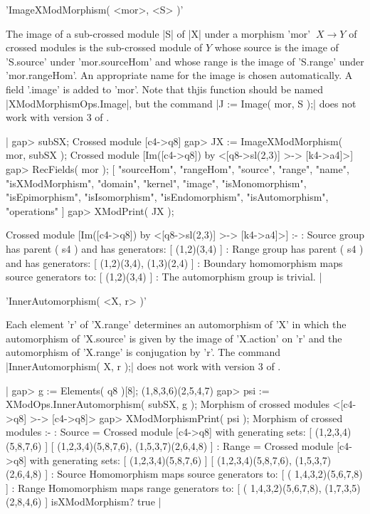 %

'ImageXModMorphism( <mor>, <S> )'

The  image of a sub-crossed module  |S| of |X|  under a morphism 'mor'
$\: X \to Y$ of crossed modules is the sub-crossed module of $Y$ whose
source  is  the image  of  'S.source' under  'mor.sourceHom' and whose
range is the image of  'S.range' under 'mor.rangeHom'.  An appropriate
name for the image is chosen automatically.  A field '.image' is added
to  'mor'.    Note      that    thjis function  should      be   named
|XModMorphismOps.Image|, but the command |J := Image(  mor, S );| does
not work with version 3 of {\GAP}.

|    gap> subSX;
    Crossed module [c4->q8]
    gap> JX := ImageXModMorphism( mor, subSX );
    Crossed module [Im([c4->q8]) by <[q8->sl(2,3)] >-> [k4->a4]>]
    gap> RecFields( mor );
    [ "sourceHom", "rangeHom", "source", "range", "name", "isXModMorphism",
       "domain", "kernel", "image", "isMonomorphism", "isEpimorphism",
       "isIsomorphism", "isEndomorphism", "isAutomorphism", "operations" ]
    gap> XModPrint( JX );
    
    Crossed module [Im([c4->q8]) by <[q8->sl(2,3)] >-> [k4->a4]>] :-
    : Source group has parent ( s4 )  and has generators:
      [ (1,2)(3,4) ]
    : Range group has parent ( s4 )  and has generators:
      [ (1,2)(3,4), (1,3)(2,4) ]
    : Boundary homomorphism maps source generators to:
      [ (1,2)(3,4) ]
    : The automorphism group is trivial.  |
    
%

'InnerAutomorphism( <X, r> )'

Each element 'r' of  'X.range' determines an   automorphism of 'X'  in
which the   automorphism of 'X.source'   is  given  by the  image   of
'X.action' on 'r' and the  automorphism of 'X.range' is conjugation by
'r'.  The command  |InnerAutomorphism(  X, r );|  does not  work  with
version 3 of {\GAP}.

|    gap> g := Elements( q8 )[8];
    (1,8,3,6)(2,5,4,7)
    gap> psi := XModOps.InnerAutomorphism( subSX, g );
    Morphism of crossed modules <[c4->q8] >-> [c4->q8]>
    gap> XModMorphismPrint( psi );
    Morphism of crossed modules :- 
    : Source = Crossed module [c4->q8] with generating sets:
      [ (1,2,3,4)(5,8,7,6) ]
      [ (1,2,3,4)(5,8,7,6), (1,5,3,7)(2,6,4,8) ]
    :  Range = Crossed module [c4->q8] with generating sets:
      [ (1,2,3,4)(5,8,7,6) ]
      [ (1,2,3,4)(5,8,7,6), (1,5,3,7)(2,6,4,8) ] 
    : Source Homomorphism maps source generators to:
      [ ( 1,4,3,2)(5,6,7,8) ]
    : Range Homomorphism maps range generators to:
      [ ( 1,4,3,2)(5,6,7,8), (1,7,3,5)(2,8,4,6) ]
      isXModMorphism? true   |
    
